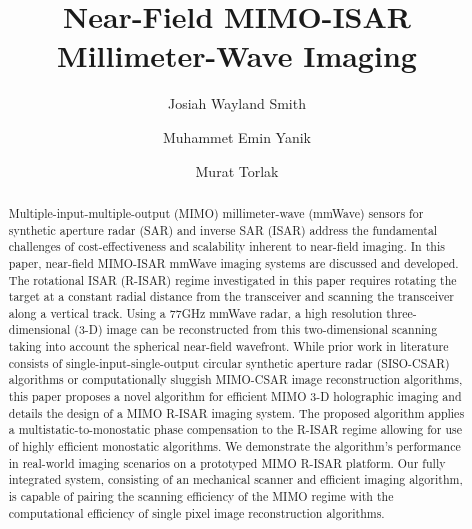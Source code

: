 \documentclass[conference]{IEEEtran}
\begin{document}
	
	\title{Near-Field MIMO-ISAR Millimeter-Wave Imaging}
	
	\author[1]{Josiah Wayland Smith}
	\author[2]{Muhammet Emin Yanik}
	\author[1]{Murat Torlak}
	
	\IEEEoverridecommandlockouts
	\maketitle
	\IEEEpubidadjcol
	
	\begin{abstract}
		
		Multiple-input-multiple-output (MIMO) millimeter-wave (mmWave) sensors for synthetic aperture radar (SAR) and inverse SAR (ISAR) address the fundamental challenges of cost-effectiveness and scalability inherent to near-field imaging. In this paper, near-field MIMO-ISAR mmWave imaging systems are discussed and developed. The rotational ISAR (R-ISAR) regime investigated in this paper requires rotating the target at a constant radial distance from the transceiver and scanning the transceiver along a vertical track. Using a 77GHz mmWave radar, a high resolution three-dimensional (3-D) image can be reconstructed from this two-dimensional scanning taking into account the spherical near-field wavefront. While prior work in literature consists of single-input-single-output circular synthetic aperture radar (SISO-CSAR) algorithms or computationally sluggish MIMO-CSAR image reconstruction algorithms, this paper proposes a novel algorithm for efficient MIMO 3-D holographic imaging and details the design of a MIMO R-ISAR imaging system. The proposed algorithm applies a multistatic-to-monostatic phase compensation to the R-ISAR regime allowing for use of highly efficient monostatic algorithms. We demonstrate the algorithm's performance in real-world imaging scenarios on a prototyped MIMO R-ISAR platform. Our fully integrated system, consisting of an mechanical scanner and efficient imaging algorithm, is capable of pairing the scanning efficiency of the MIMO regime with the computational efficiency of single pixel image reconstruction algorithms.
		
		\end {abstract}
		
\end{document}
